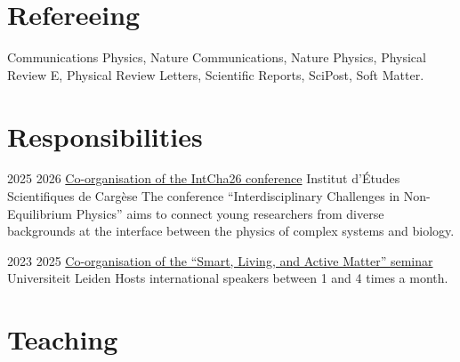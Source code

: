 \documentclass[a4paper]{cvtemplate_en} %
\begin{document}
\section{Refereeing}

Communications Physics, Nature Communications, Nature Physics, Physical Review E,  Physical Review Letters, Scientific Reports, SciPost, Soft Matter.
\vspace{25pt}


\section{Responsibilities}

\begin{cvbody}

\cvitem
    {2025}
    {2026}
    {\href{https://intcha26.sciencesconf.org}{Co-organisation of the IntCha26 conference}}
    {Institut d'\'Etudes Scientifiques de Carg\`ese }
    {}{}{}
    {}
    {The conference ``Interdisciplinary Challenges in Non-Equilibrium Physics'' aims to connect young researchers from diverse backgrounds at the interface between the physics of complex systems and biology.\vspace{5pt}}

\cvitem
	{2023}
	{2025}
	{\href{https://slam-leiden.nl}{Co-organisation of the ``Smart, Living, and Active Matter'' seminar}}
	{Universiteit Leiden }
	{}{}{}
    {}
	{Hosts international speakers between 1 and 4 times a month.\vspace{12.5pt}}

\end{cvbody}


\section{Teaching}
\end{document}
